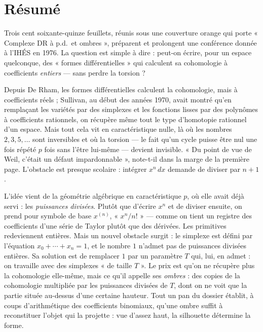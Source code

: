 \documentclass[11pt,a4paper]{article}
\begin{document}
\section*{Résumé}

\begin{resume}
Trois cent soixante-quinze feuillets, réunis sous une couverture orange qui
porte « Complexe DR à p.d.\ et ombres », préparent et prolongent une conférence
donnée à l'IHÉS en 1976. La question est simple à dire : peut-on écrire, pour
un espace quelconque, des « formes différentielles » qui calculent sa
cohomologie à coefficients \emph{entiers} — sans perdre la torsion ?

Depuis De Rham, les formes différentielles calculent la cohomologie, mais à
coefficients réels ; Sullivan, au début des années 1970, avait montré qu'en
remplaçant les variétés par des simplexes et les fonctions lisses par des
polynômes à coefficients rationnels, on récupère même tout le type d'homotopie
rationnel d'un espace. Mais tout cela vit en caractéristique nulle, là où les
nombres $2, 3, 5, \ldots$ sont inversibles et où la torsion — le fait qu'un
cycle puisse être nul une fois répété $p$ fois sans l'être lui-même — devient
invisible. « Du point de vue de Weil, c'était un défaut impardonnable »,
note-t-il dans la marge de la première page. L'obstacle est presque scolaire :
intégrer $x^n\,dx$ demande de diviser par $n+1$.

L'idée vient de la géométrie algébrique en caractéristique $p$, où elle avait
déjà servi : les \emph{puissances divisées}. Plutôt que d'écrire $x^n$ et de
diviser ensuite, on prend pour symbole de base $x^{(n)}$, « $x^n/n!$ » — comme
on tient un registre des coefficients d'une série de Taylor plutôt que des
dérivées. Les primitives redeviennent entières. Mais un nouvel obstacle
surgit : le simplexe est défini par l'équation $x_0 + \cdots + x_n = 1$, et le
nombre $1$ n'admet pas de puissances divisées entières. Sa solution est de
remplacer $1$ par un paramètre $T$ qui, lui, en admet : on travaille avec des
simplexes « de taille $T$ ». Le prix est qu'on ne récupère plus la cohomologie
elle-même, mais ce qu'il appelle ses \emph{ombres} : des copies de la
cohomologie multipliée par les puissances divisées de $T$, dont on ne voit que
la partie située au-dessus d'une certaine hauteur. Tout un pan du dossier
établit, à coups d'arithmétique des coefficients binomiaux, qu'une ombre suffit
à reconstituer l'objet qui la projette : vue d'assez haut, la silhouette
détermine la forme.


\end{resume}
\end{document}
